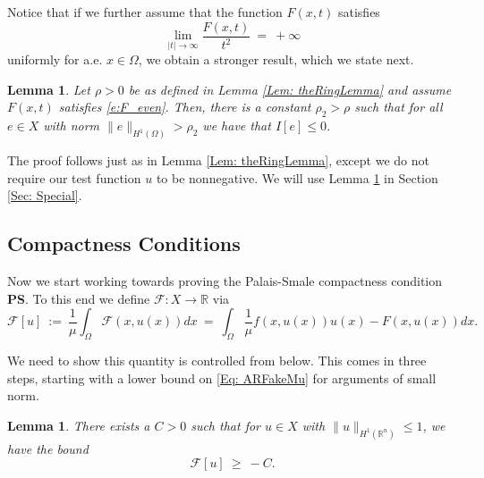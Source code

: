 \documentclass[11pt]{amsart}   	%
\theoremstyle{plain}
\numberwithin{equation}{section}
\newtheorem{lemma}[thm]{Lemma}
\def\Om{\Omega}
\def\R{\mathbb{R}}
\begin{document}
 Notice that if we further assume that the function $F(x,t)$ satisfies
  \begin{equation}\label{e:F_even}
    \lim_{|t| \rightarrow \infty}\frac{F(x, t)}{t^2} \ = \ +\infty
    \end{equation}
 uniformly for a.e. $x \in \Omega$, we obtain a stronger result, which we state next.  
 
 \begin{lemma}\label{Lem: coercivityLemH^1_v2}
Let $\rho > 0$ be as defined in Lemma \ref{Lem: theRingLemma} and 
assume $F(x,t)$ satisfies \eqref{e:F_even}. Then, there is a constant $\rho_2>\rho$
such that for all $e \in X$ with norm $\| e\|_{H^1(\Omega)} > \rho_2$ we have that $I[e] \leq 0$.
\end{lemma}

The proof  follows just as in Lemma \ref{Lem: theRingLemma}, except we do not require our test function $u$ to be nonnegative. We will use Lemma \ref{Lem: coercivityLemH^1_v2} in Section \ref{Sec: Special}.


\subsection{Compactness Conditions}

Now we start working towards proving the Palais-Smale compactness condition \textbf{PS}. To this end we define $\mathscr{F}: X \rightarrow \R$ via 
\begin{equation}\label{Eq: ARFakeMu}
    \mathscr{F}[u] \ := 
    \ \frac{1}{\mu}\int_{\Om}\mathcal{F}(x, u(x))dx \ = \ \int_{\Om}\frac{1}{\mu}f(x, u(x))u(x) - F(x, u(x))dx .
\end{equation}

We need to show this quantity is controlled from below. This comes in three steps, starting with a lower bound on \eqref{Eq: ARFakeMu} for arguments of small norm.

\begin{lemma}\label{Lem: FakeARBoundLem1}
    There exists a $C > 0$ such that for $u \in X$ with $\|u\|_{H^1(\R^n)} \leq 1$, we have the bound
    \begin{equation}\label{Eq: FakeARBoundLem1Eq}
        \mathscr{F}[u] \ \geq \ -C.
    \end{equation}
\end{lemma}
\end{document}
